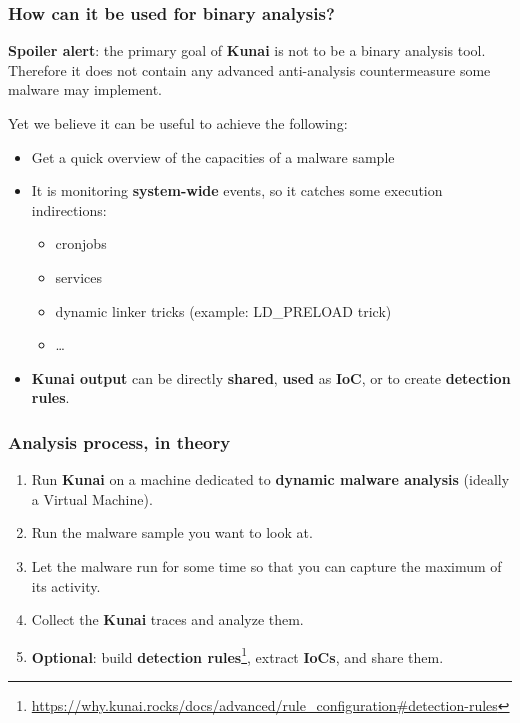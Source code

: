 \begin{frame}
	\frametitle{How can it be used for binary analysis?}

	\textbf{Spoiler alert}: the primary goal of \textbf{Kunai} is not to be a binary analysis tool. Therefore it does not contain any advanced anti-analysis countermeasure some malware may implement.

	\vspace{1em}
	\par
	Yet we believe it can be useful to achieve the following:
	\begin{itemize}
		\item Get a quick overview of the capacities of a malware sample
		\item It is monitoring \textbf{system-wide} events, so it catches some execution indirections:
		      \begin{itemize}
			      \item cronjobs
			      \item services
			      \item dynamic linker tricks (example: LD\_PRELOAD trick)
			      \item \ldots
		      \end{itemize}
		\item \textbf{Kunai output} can be directly \textbf{shared}, \textbf{used} as \textbf{IoC}, or to create \textbf{detection rules}.
	\end{itemize}
\end{frame}

\begin{frame}
	\frametitle{Analysis process, in theory}

	\begin{enumerate}
		\item Run \textbf{Kunai} on a machine dedicated to \textbf{dynamic malware analysis} (ideally a Virtual Machine).
		\item Run the malware sample you want to look at.
		\item Let the malware run for some time so that you can capture the maximum of its activity.
		\item Collect the \textbf{Kunai} traces and analyze them.
		\item \textbf{Optional}: build \textbf{detection rules}\footnote{\url{https://why.kunai.rocks/docs/advanced/rule\_configuration\#detection-rules}}, extract \textbf{IoCs}, and share them.
	\end{enumerate}
\end{frame}

